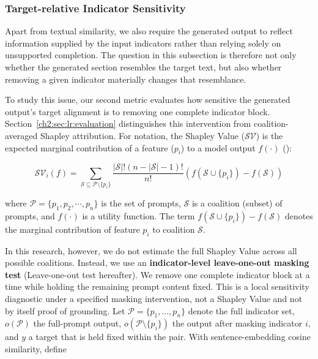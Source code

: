 \fi


\subsubsection*{Target-relative Indicator Sensitivity}

Apart from textual similarity, we also require the generated output to reflect information supplied by the input indicators rather than relying solely on unsupported completion. The question in this subsection is therefore not only whether the generated section resembles the target text, but also whether removing a given indicator materially changes that resemblance.


To study this issue, our second metric evaluates how sensitive the generated
output's target alignment is to removing one complete indicator block.
Section~\ref{ch2:sec:lr:evaluation} distinguishes this intervention from
coalition-averaged Shapley attribution. For notation, the Shapley Value
($\mathcal{SV}$) is the expected marginal contribution of a feature ($p_i$)
to a model output $f(\cdot)$ (\cite{shapley1953value}):

\begin{equation*}
  \mathcal{SV}_i(f) = \sum_{\mathcal{S} \subseteq \mathcal{P}\setminus\{p_i\}} \frac{\left|\mathcal{S}\right|! (n - \left|\mathcal{S}\right| - 1)!}{n!} \left(f(\mathcal{S}\cup\{p_i\}) - f(\mathcal{S})\right)
\end{equation*}

where $\mathcal{P}=\{p_1, p_2, \cdots, p_n\}$ is the set of prompts, $\mathcal{S}$ is a coalition (subset) of prompts, and $f(\cdot)$ is a utility function. The term $f(\mathcal{S}\cup\{p_i\})-f(\mathcal{S})$ denotes the marginal contribution of feature $p_i$ to coalition $\mathcal{S}$.


In this research, however, we do not estimate the full Shapley Value across all possible coalitions. Instead, we use an \textbf{indicator-level leave-one-out masking test} (Leave-one-out test hereafter). We remove one complete indicator block at a time while holding the remaining prompt content fixed. This is a local sensitivity diagnostic under a specified masking intervention, not a Shapley Value and not by itself proof of grounding. Let $\mathcal{P}=\{p_1,\ldots,p_n\}$ denote the full indicator set, $o(\mathcal{P})$ the full-prompt output, $o(\mathcal{P}\setminus\{p_i\})$ the output after masking indicator $i$, and $y$ a target that is held fixed within the pair. With sentence-embedding cosine similarity, define

